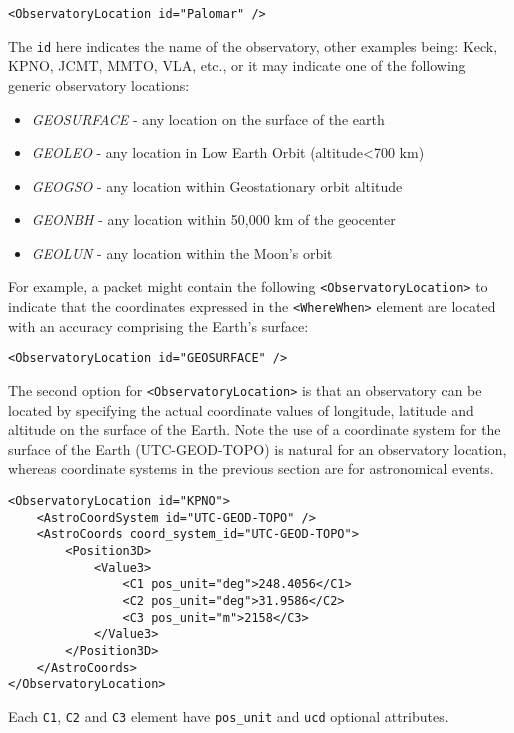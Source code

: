 \documentclass[11pt,a4paper]{ivoa}
\begin{document}
\begin{lstlisting}
<ObservatoryLocation id="Palomar" />
\end{lstlisting}

The {\tt id} here indicates the name of the observatory, other examples being:
Keck, KPNO, JCMT, MMTO, VLA, etc., or it may indicate one of the following
generic observatory locations:
\begin{itemize}
\item \emph{GEOSURFACE} - any location on the surface of the earth
\item \emph{GEOLEO} - any location in Low Earth Orbit (altitude<700 km)
\item \emph{GEOGSO} - any location within Geostationary orbit altitude
\item \emph{GEONBH} - any location within 50,000 km of the geocenter
\item \emph{GEOLUN} - any location within the Moon's orbit
\end{itemize}

For example, a packet might contain the following {\tt <ObservatoryLocation>}
to indicate that the coordinates expressed in the {\tt <WhereWhen>} element are
located with an accuracy comprising the Earth's surface:
\begin{lstlisting}
<ObservatoryLocation id="GEOSURFACE" />
\end{lstlisting}

The second option for {\tt <ObservatoryLocation>} is that an observatory can be
located by specifying the actual coordinate values of longitude, latitude and
altitude on the surface of the Earth. Note the use of a coordinate system for
the surface of the Earth (UTC-GEOD-TOPO) is natural for an observatory location,
whereas coordinate systems in the previous section are for astronomical events.
\begin{lstlisting}
<ObservatoryLocation id="KPNO">
    <AstroCoordSystem id="UTC-GEOD-TOPO" />
    <AstroCoords coord_system_id="UTC-GEOD-TOPO">
        <Position3D>
            <Value3>
                <C1 pos_unit="deg">248.4056</C1>
                <C2 pos_unit="deg">31.9586</C2>
                <C3 pos_unit="m">2158</C3>
            </Value3>
        </Position3D>
    </AstroCoords>
</ObservatoryLocation>
\end{lstlisting}

Each {\tt C1}, {\tt C2} and {\tt C3} element have {\tt pos\_unit} and {\tt ucd}
optional attributes.
\end{document}
